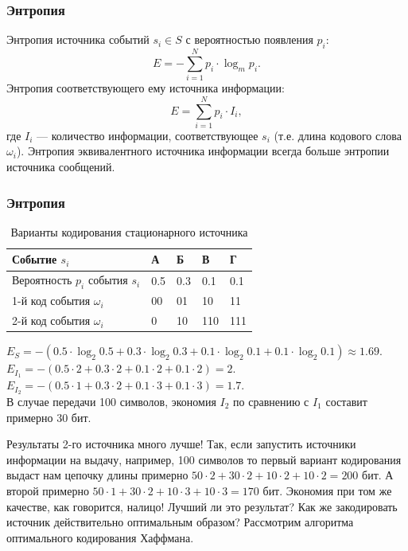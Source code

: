 \begin{frame}
\frametitle{Энтропия}
Энтропия источника \alert{событий} $s_i\in S$ с вероятностью появления $p_i$:
\[E=-\sum_{i=1}^{N}p_{i}\cdot \log_{m}p_i.\]
Энтропия соответствующего ему источника \alert{информации}:
\[E=\sum_{i=1}^{N}p_{i}\cdot I_i,\]
где $I_i$ --- количество информации, соответствующее $s_i$ (т.е. длина кодового слова $\omega_i$). Энтропия эквивалентного источника информации всегда больше энтропии источника сообщений.
\end{frame}


\begin{frame}
\frametitle{Энтропия}
\begin{example}
    \begin{table}[ht]
    \caption{Варианты кодирования стационарного источника}
    \label{t:optStatSource}
    \centering
    \begin{tabular}[c]{|l|l|l|l|l|}
        \hline
        Событие $s_i$                       &А      &Б      &В      &Г    \\ \hline
        Вероятность $p_i$ события $s_i$     &0.5    &0.3    &0.1    &0.1  \\ \hline
        \hline
        1-й код события $\omega_i$          &00     &01     &10     &11   \\ \hline
        2-й код события $\omega_i$          &0      &10     &110    &111  \\ \hline
    \end{tabular}
    \end{table}
\end{example}
$E_S=-(0.5\cdot \log_2 0.5+0.3\cdot \log_2 0.3+0.1\cdot \log_2 0.1+0.1\cdot \log_2 0.1)\approx 1.69$.\\
$E_{I_1}=-(0.5\cdot 2+0.3\cdot 2+0.1\cdot 2+0.1\cdot 2)=2$.\\
$E_{I_2}=-(0.5\cdot 1+0.3\cdot 2+0.1\cdot 3+0.1\cdot 3)=1.7$.\\
В случае передачи 100 символов, экономия $I_2$ по сравнению с $I_1$ составит примерно 30 бит.
\end{frame}

Результаты 2-го источника много лучше! Так, если запустить источники информации на выдачу, например, 100 символов то первый вариант кодирования выдаст нам цепочку длины примерно $50\cdot 2+30\cdot 2+10\cdot 2+10\cdot 2=200$ бит. А второй примерно $50\cdot 1+30\cdot 2+10\cdot 3+10\cdot 3=170$ бит. Экономия при том же качестве, как говорится, налицо! Лучший ли это результат? Как же закодировать источник действительно оптимальным образом? Рассмотрим алгоритма оптимального кодирования Хаффмана.


